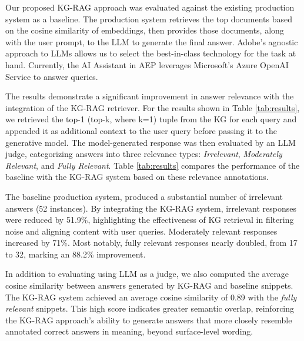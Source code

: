 Our proposed KG-RAG approach was evaluated against the existing production system as a baseline. The production system retrieves the top documents based on the cosine similarity of embeddings, then provides those documents, along with the user prompt, to the LLM to generate the final answer. Adobe's agnostic approach to LLMs allows us to select the best-in-class technology for the task at hand. Currently, the AI Assistant in AEP\cite{adobe_ai_assistant_2025} leverages Microsoft's Azure OpenAI Service to answer queries.



The results demonstrate a significant improvement in answer relevance with the integration of the KG-RAG retriever. For the results shown in Table \ref{tab:results}, we retrieved the top-1 (top-k, where k=1) tuple from the KG for each query and appended it as additional context to the user query before passing it to the generative model. The model-generated response was then evaluated by an LLM judge, categorizing answers into three relevance types: \textit{Irrelevant}, \textit{Moderately Relevant}, and \textit{Fully Relevant}. Table \ref{tab:results} compares the performance of the baseline with the KG-RAG system based on these relevance annotations.


The baseline production system, produced a substantial number of irrelevant answers (52 instances). By integrating the KG-RAG system, irrelevant responses were reduced by 51.9\%, highlighting the effectiveness of KG retrieval in filtering noise and aligning content with user queries. Moderately relevant responses increased by 71\%. Most notably, fully relevant responses nearly doubled, from 17 to 32, marking an 88.2\% improvement.



In addition to evaluating using LLM as a judge, we also computed the average cosine similarity between answers generated by KG-RAG and baseline snippets. The KG-RAG system achieved an average cosine similarity of 0.89 with the \textit{fully relevant} snippets. This high score indicates greater semantic overlap, reinforcing the KG-RAG approach's ability to generate answers that more closely resemble annotated correct answers in meaning, beyond surface-level wording.

